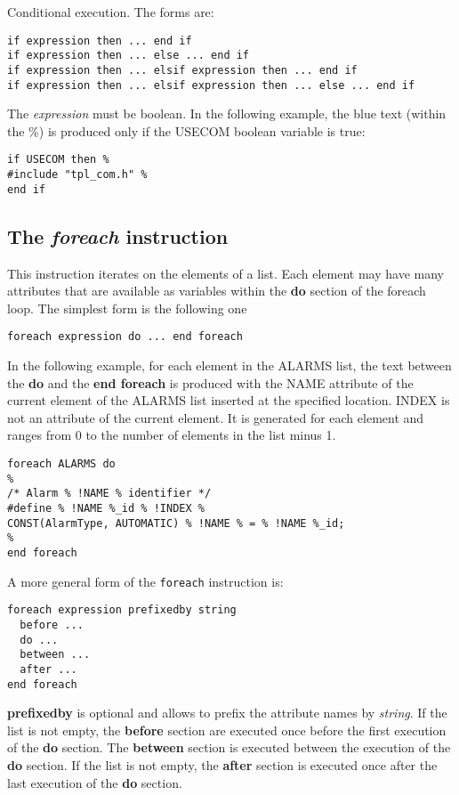 Conditional execution. The forms are:

\begin{lstlisting}
if expression then ... end if
if expression then ... else ... end if
if expression then ... elsif expression then ... end if
if expression then ... elsif expression then ... else ... end if
\end{lstlisting}    

The {\em expression} must be boolean. In the following example, the blue text (within the \%) is produced only if the USECOM boolean variable is true:

\begin{lstlisting}
if USECOM then %
#include "tpl_com.h" %
end if
\end{lstlisting}

\subsection{The {\em foreach} instruction}

This instruction iterates on the elements of a list. Each element may have many attributes that are available as variables within the {\bf do} section of the foreach loop. The simplest form is the following one

\begin{lstlisting}
foreach expression do ... end foreach
\end{lstlisting}

In the following example, for each element in the ALARMS list, the text between the {\bf do} and the {\bf end foreach} is produced with the NAME attribute of the current element of the ALARMS list inserted at the specified location. INDEX is not an attribute of the current element. It is generated for each element and ranges from 0 to the number of elements in the list minus 1.
\begin{lstlisting}
foreach ALARMS do
%
/* Alarm % !NAME % identifier */
#define % !NAME %_id % !INDEX %
CONST(AlarmType, AUTOMATIC) % !NAME % = % !NAME %_id;
%
end foreach
\end{lstlisting}

A more general form of the {\tt foreach} instruction is:

\begin{lstlisting}
foreach expression prefixedby string
  before ...
  do ...
  between ...
  after ...
end foreach
\end{lstlisting}

{\bf prefixedby} is optional and allows to prefix the attribute names by {\em string}. If the list is not empty, the {\bf before} section are executed once before the first execution of the {\bf do} section. The {\bf between} section is executed between the execution of the {\bf do} section.  If the list is not empty, the {\bf after} section is executed once after the last execution of the {\bf do} section.

